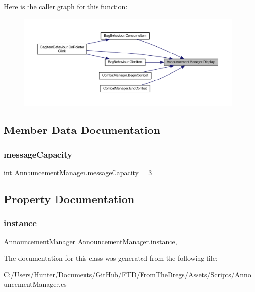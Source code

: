 Here is the caller graph for this function\+:
\nopagebreak
\begin{figure}[H]
\begin{center}
\leavevmode
\includegraphics[width=350pt]{class_announcement_manager_a931bdfbc829e1165fdbd7a3a848e95d1_icgraph}
\end{center}
\end{figure}


\subsection{Member Data Documentation}
\mbox{\label{class_announcement_manager_aa23d155cc088be3437ef92cc337c0492}} 
\subsubsection{\texorpdfstring{messageCapacity}{messageCapacity}}
{\footnotesize\ttfamily int Announcement\+Manager.\+message\+Capacity = 3\hspace{0.3cm}{\ttfamily [static]}}



\subsection{Property Documentation}
\mbox{\label{class_announcement_manager_a23f0a77f19174bf82815db8a2c3f4c94}} 
\subsubsection{\texorpdfstring{instance}{instance}}
{\footnotesize\ttfamily \mbox{\hyperlink{class_announcement_manager}{Announcement\+Manager}} Announcement\+Manager.\+instance\hspace{0.3cm}{\ttfamily [static]}, {\ttfamily [get]}}



The documentation for this class was generated from the following file\+:\begin{DoxyCompactItemize}
\item 
C\+:/\+Users/\+Hunter/\+Documents/\+Git\+Hub/\+F\+T\+D/\+From\+The\+Dregs/\+Assets/\+Scripts/Announcement\+Manager.\+cs\end{DoxyCompactItemize}
